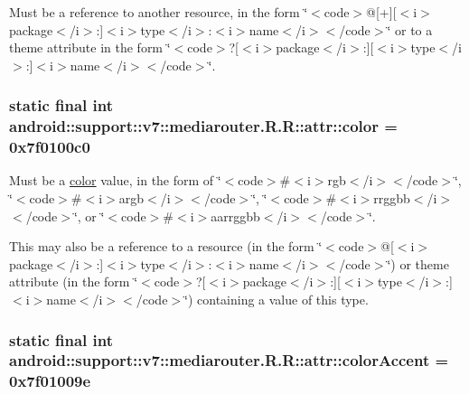 Must be a reference to another resource, in the form \char`\"{}$<$code$>$@\mbox{[}+\mbox{]}\mbox{[}$<$i$>$package$<$/i$>$:\mbox{]}$<$i$>$type$<$/i$>$:$<$i$>$name$<$/i$>$$<$/code$>$\char`\"{} or to a theme attribute in the form \char`\"{}$<$code$>$?\mbox{[}$<$i$>$package$<$/i$>$:\mbox{]}\mbox{[}$<$i$>$type$<$/i$>$:\mbox{]}$<$i$>$name$<$/i$>$$<$/code$>$\char`\"{}. \hypertarget{classandroid_1_1support_1_1v7_1_1mediarouter_1_1_r_1_1attr_52f7173cbe73a4bee56c94f5b9013967}{
\subsubsection[{color}]{\setlength{\rightskip}{0pt plus 5cm}static final int android::support::v7::mediarouter.R.R::attr::color = 0x7f0100c0}}
\label{classandroid_1_1support_1_1v7_1_1mediarouter_1_1_r_1_1attr_52f7173cbe73a4bee56c94f5b9013967}


Must be a \hyperlink{classandroid_1_1support_1_1v7_1_1mediarouter_1_1_r_1_1color}{color} value, in the form of \char`\"{}$<$code$>$\#$<$i$>$rgb$<$/i$>$$<$/code$>$\char`\"{}, \char`\"{}$<$code$>$\#$<$i$>$argb$<$/i$>$$<$/code$>$\char`\"{}, \char`\"{}$<$code$>$\#$<$i$>$rrggbb$<$/i$>$$<$/code$>$\char`\"{}, or \char`\"{}$<$code$>$\#$<$i$>$aarrggbb$<$/i$>$$<$/code$>$\char`\"{}. 

This may also be a reference to a resource (in the form \char`\"{}$<$code$>$@\mbox{[}$<$i$>$package$<$/i$>$:\mbox{]}$<$i$>$type$<$/i$>$:$<$i$>$name$<$/i$>$$<$/code$>$\char`\"{}) or theme attribute (in the form \char`\"{}$<$code$>$?\mbox{[}$<$i$>$package$<$/i$>$:\mbox{]}\mbox{[}$<$i$>$type$<$/i$>$:\mbox{]}$<$i$>$name$<$/i$>$$<$/code$>$\char`\"{}) containing a value of this type. \hypertarget{classandroid_1_1support_1_1v7_1_1mediarouter_1_1_r_1_1attr_384e39dc0be01b0ad5ae15024ecde86e}{
\subsubsection[{colorAccent}]{\setlength{\rightskip}{0pt plus 5cm}static final int android::support::v7::mediarouter.R.R::attr::colorAccent = 0x7f01009e}}
\label{classandroid_1_1support_1_1v7_1_1mediarouter_1_1_r_1_1attr_384e39dc0be01b0ad5ae15024ecde86e}


